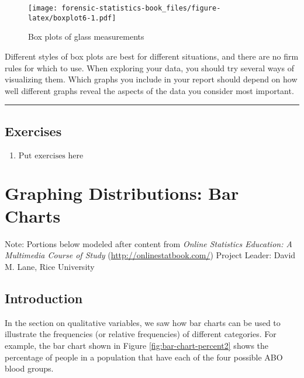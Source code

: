 \documentclass[
]{book}
\providecommand{\tightlist}{%
  \setlength{\itemsep}{0pt}\setlength{\parskip}{0pt}}
\begin{document}
\begin{figure}
\centering
\texttt{[image: forensic-statistics-book\_files/figure-latex/boxplot6-1.pdf]}
\caption{\label{fig:boxplot6}Box plots of glass measurements}
\end{figure}

Different styles of box plots are best for different situations, and there are
no firm rules for which to use. When exploring your data, you should try several
ways of visualizing them. Which graphs you include in your report should depend
on how well different graphs reveal the aspects of the data you consider most
important.

\begin{center}\rule{0.5\linewidth}{0.5pt}\end{center}

\hypertarget{exercises-4}{%
\section{Exercises}\label{exercises-4}}

\begin{enumerate}
\def\labelenumi{\arabic{enumi}.}
\tightlist
\item
  \(\text{Put exercises here}\)
\end{enumerate}

\hypertarget{graphing-distributions-bar-charts}{%
\chapter{Graphing Distributions: Bar Charts}\label{graphing-distributions-bar-charts}}

Note: Portions below modeled after content from
\emph{Online Statistics Education: A Multimedia Course of Study}
(\url{http://onlinestatbook.com/}) Project Leader: David M. Lane, Rice University

\hypertarget{introduction-2}{%
\section{Introduction}\label{introduction-2}}

In the section on qualitative variables, we saw how bar charts can be used
to illustrate the frequencies (or relative frequencies) of different categories.
For example, the bar chart shown in Figure \ref{fig:bar-chart-percent2}
shows the percentage of people in a population that have each of the four
possible ABO blood groups.
\end{document}
